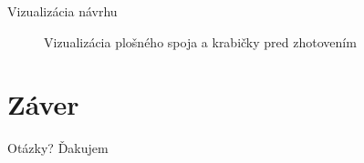 \documentclass[hyperref={unicode}]{beamer}
\begin{document}
\begin{frame}{Vizualizácia návrhu}
\begin{figure}[htp]
		\caption{Vizualizácia plošného spoja a krabičky pred zhotovením}
	\end{figure}
\end{frame}


\section{Záver}

\begin{frame}{Otázky?}
	\centering
	{\Large Ďakujem}
\end{frame}
\end{document}
